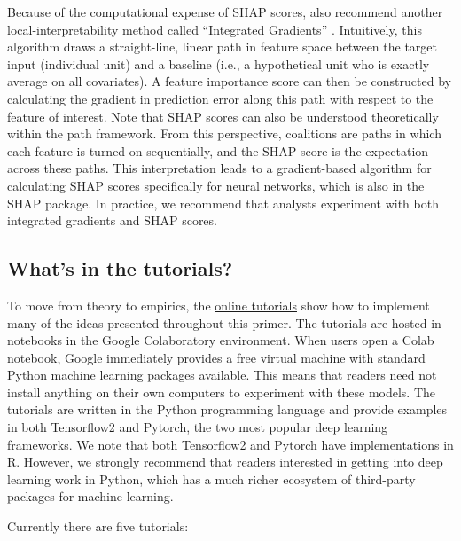 Because of the computational expense of SHAP scores, \citet{crabbe2022benchmarking} also recommend another local-interpretability method called “Integrated Gradients” \citep{sundararajan2017axiomatic}. Intuitively, this algorithm draws a straight-line, linear path in feature space between the target input (individual unit) and a baseline (i.e., a hypothetical unit who is exactly average on all covariates). A feature importance score can then be constructed by calculating the gradient in prediction error along this path with respect to the feature of interest. Note that SHAP scores can also be understood theoretically within the path framework. From this perspective, coalitions are paths in which each feature is turned on sequentially, and the SHAP score is the expectation across these paths. This interpretation leads to a gradient-based algorithm for calculating SHAP scores specifically for neural networks, which is also in the SHAP package. In practice, we recommend that analysts experiment with both integrated gradients and SHAP scores.

\subsection{What's in the tutorials?}
\label{subsection:tutorials}

To move from theory to empirics, the \href{https://github.com/kochbj/Deep-Learning-for-Causal-Inference/tree/main}{online tutorials} show how to implement many of the ideas presented throughout this primer. The tutorials are hosted in notebooks in the Google Colaboratory environment. When users open a Colab notebook, Google immediately provides a free virtual machine with standard Python machine learning packages available. This means that readers need not install anything on their own computers to experiment with these models. The tutorials are written in the Python programming language and provide examples in both Tensorflow2 and Pytorch, the two most popular deep learning frameworks. We note that both Tensorflow2 and Pytorch have implementations in R. However, we strongly recommend that readers interested in getting into deep learning work in Python, which has a much richer ecosystem of third-party packages for machine learning. 

Currently there are five tutorials:

